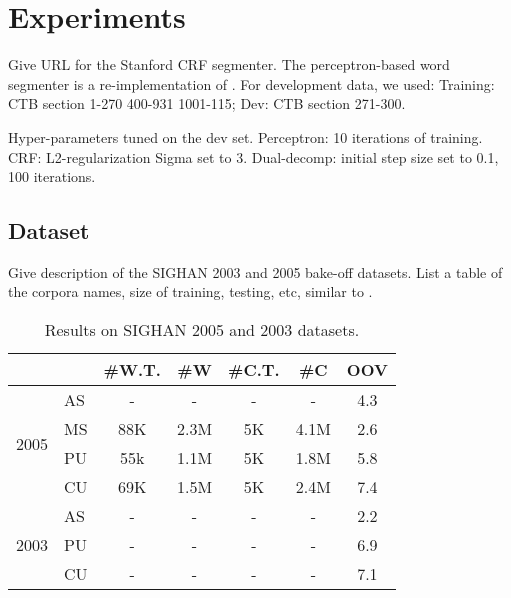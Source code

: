\section{Experiments}

Give URL for the Stanford CRF segmenter. The perceptron-based word segmenter is a re-implementation of \cite{Zhang:2007:ACL}.
For development data, we used:
Training: CTB section 1-270  400-931 1001-115;   Dev: CTB section 271-300.

Hyper-parameters tuned on the dev set.
Perceptron: 10 iterations of training. 
CRF: L2-regularization Sigma set to 3.
Dual-decomp: initial step size set to 0.1, 100 iterations. 

\subsection{Dataset}
Give description of the SIGHAN 2003 \cite{Sproat:2003:SIGHAN} and 2005 \cite{Emerson:2005:SIGHAN} bake-off datasets. 
List a table of the corpora names, size of training, testing, etc, similar to \cite{Sun:2010:COLING}.


\begin{table}
\centering
\begin{small}
\begin{tabular}{ l | l | c | c | c | c | c   }
\hline
    \multicolumn{2}{c}{}  &  \multicolumn{1}{c}{\#W.T.} &  \multicolumn{1}{c}{\#W} &  \multicolumn{1}{c}{\#C.T.}    & \multicolumn{1}{c}{\#C}   &  \multicolumn{1}{c}{OOV}  \\ 
\hline
\multirow{4}{*}{2005}  & AS      & -  &  -  & -  &  - & 4.3   \\
& MS      & 88K & 2.3M & 5K & 4.1M & 2.6 \\
& PU      &  55k & 1.1M & 5K & 1.8M & 5.8  \\
& CU      & 69K  & 1.5M& 5K & 2.4M & 7.4 \\
\hline
\multirow{3}{*}{2003} & AS  &  - & - & - & - & 2.2 \\
& PU  &  - & - & - & - & 6.9 \\
& CU  & - & - & - & - & 7.1  \\

\end{tabular} 
\caption{Results on SIGHAN 2005 and 2003 datasets. }\label{tbl:results}
\end{small}
\end{table}